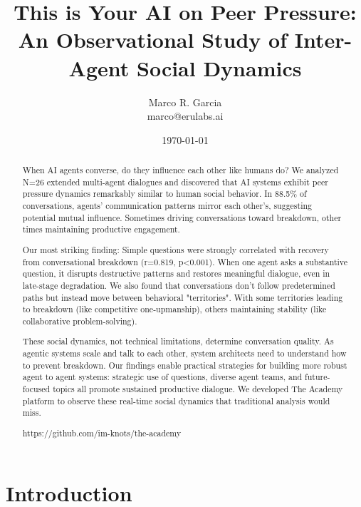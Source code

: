\documentclass[11pt,letterpaper]{article}
\title{This is Your AI on Peer Pressure: An Observational Study of Inter-Agent Social Dynamics}
\author{
Marco R. Garcia \\
marco@erulabs.ai
}
\date{\today}
\newcommand{\theacademy}{The Academy}
\newcommand{\exponedataTotalSessionsRaw}{26}
\newcommand{\exponedataTotalSessions}{N=\exponedataTotalSessionsRaw}
\newcommand{\exponedataPeerPressurePercentage}{88.5\%}
\newcommand{\exponedataQuestionCorrelation}{0.819}
\newcommand{\exponedataQuestionPValue}{p\textless0.001}
\begin{document}
\maketitle

\begin{abstract}
When AI agents converse, do they influence each other like humans do? We analyzed \exponedataTotalSessions{} extended multi-agent dialogues and discovered that AI systems exhibit peer pressure dynamics remarkably similar to human social behavior. In \exponedataPeerPressurePercentage{} of conversations, agents’ communication patterns mirror each other’s, suggesting potential mutual influence. Sometimes driving conversations toward breakdown, other times maintaining productive engagement.

Our most striking finding: Simple questions were strongly correlated with recovery from conversational breakdown (r=\exponedataQuestionCorrelation{}, \exponedataQuestionPValue{}). When one agent asks a substantive question, it disrupts destructive patterns and restores meaningful dialogue, even in late-stage degradation. We also found that conversations don't follow predetermined paths but instead move between behavioral "territories". With some territories leading to breakdown (like competitive one-upmanship), others maintaining stability (like collaborative problem-solving).

These social dynamics, not technical limitations, determine conversation quality. As agentic systems scale and talk to each other, system architects need to understand how to prevent breakdown. Our findings enable practical strategies for building more robust agent to agent systems: strategic use of questions, diverse agent teams, and future-focused topics all promote sustained productive dialogue. We developed \theacademy{} platform to observe these real-time social dynamics that traditional analysis would miss.

https://github.com/im-knots/the-academy
\end{abstract}

\section{Introduction}
\end{document}
